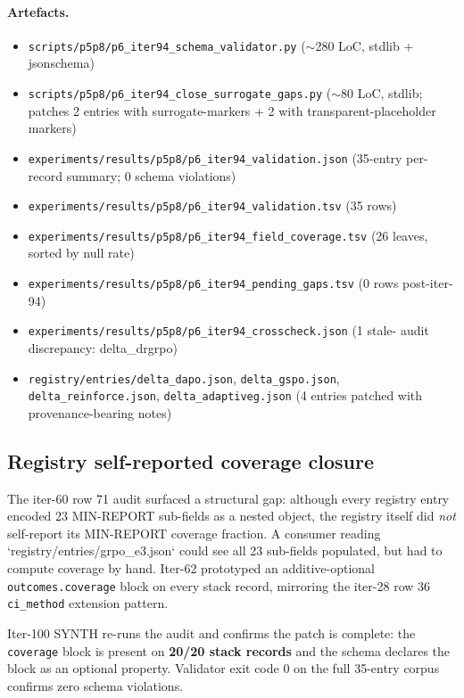 \documentclass{article}
\begin{document}
\paragraph{Artefacts.}
\begin{itemize}\itemsep0pt
\item \texttt{scripts/p5p8/p6\_iter94\_schema\_validator.py} ($\sim$280 LoC,
  stdlib + jsonschema)
\item \texttt{scripts/p5p8/p6\_iter94\_close\_surrogate\_gaps.py} ($\sim$80 LoC,
  stdlib; patches 2 entries with surrogate-markers + 2 with
  transparent-placeholder markers)
\item \texttt{experiments/results/p5p8/p6\_iter94\_validation.json} (35-entry
  per-record summary; 0 schema violations)
\item \texttt{experiments/results/p5p8/p6\_iter94\_validation.tsv} (35 rows)
\item \texttt{experiments/results/p5p8/p6\_iter94\_field\_coverage.tsv}
  (26 leaves, sorted by null rate)
\item \texttt{experiments/results/p5p8/p6\_iter94\_pending\_gaps.tsv}
  (0 rows post-iter-94)
\item \texttt{experiments/results/p5p8/p6\_iter94\_crosscheck.json} (1 stale-
  audit discrepancy: delta\_drgrpo)
\item \texttt{registry/entries/delta\_dapo.json}, \texttt{delta\_gspo.json},
  \texttt{delta\_reinforce.json}, \texttt{delta\_adaptiveg.json} (4 entries
  patched with provenance-bearing notes)
\end{itemize} \subsection{Registry self-reported coverage closure}
\label{sec:p6-coverage-closure}

The iter-60 row 71 audit surfaced a structural gap: although every
registry entry encoded 23 MIN-REPORT sub-fields as a nested object, the
registry itself did \emph{not} self-report its MIN-REPORT coverage
fraction. A consumer reading `registry/entries/grpo_e3.json` could see
all 23 sub-fields populated, but had to compute coverage by hand. Iter-62
prototyped an additive-optional \texttt{outcomes.coverage} block on
every stack record, mirroring the iter-28 row 36 \texttt{ci\_method}
extension pattern.

Iter-100 SYNTH re-runs the audit and confirms the patch is complete: the
\texttt{coverage} block is present on \textbf{20/20 stack records} and
the schema declares the block as an optional property. Validator exit
code 0 on the full 35-entry corpus confirms zero schema violations.
\end{document}
